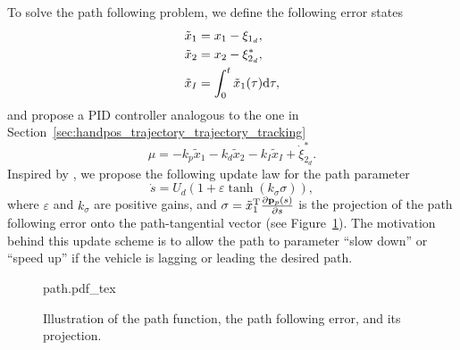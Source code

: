 To solve the path following problem, we define the following error states
\begin{subequations}
    \begin{align}
        \tilde{x}_1 &= x_1 - \xi_{1_d}, \\
        \tilde{x}_2 &= x_2 - \xi_{2_d}^{*}, \\
        \tilde{x}_I &= \int_{0}^t \tilde{x}_1(\tau) {\rm d}\tau,
    \end{align}
\end{subequations}
and propose a PID controller analogous to the one in Section~\ref{sec:handpos_trajectory_trajectory_tracking}
\begin{equation}
    \mu = -k_p\tilde{x}_1 - k_d\tilde{x}_2 - k_I\tilde{x}_I + \dot{\xi}_{2_d}^{*}.
\end{equation}
Inspired by \cite{belleter_2019_observer}, we propose the following update law for the path parameter 
\begin{equation}
    \dot{s} = U_d\left(1 + \varepsilon\tanh\left(k_{\sigma}\sigma\right)\right), \label{eq:handpos_trajectory_s_dot}
\end{equation}
where $\varepsilon$ and $k_{\sigma}$ are positive gains, and $\sigma = \tilde{x}_1^{\mathrm{T}} \frac{\partial \mathbf{p}_p(s)}{\partial s}$ is the projection of the path following error onto the path-tangential vector (see Figure~\ref{fig:path}).
The motivation behind this update scheme is to allow the path to parameter ``slow down'' or ``speed up'' if the vehicle is lagging or leading the desired path.

\begin{figure}[tb]
    \centering
    \def\svgwidth{0.6 \textwidth}
    {path.pdf_tex}
    \vspace*{-2mm}
    \caption{Illustration of the path function, the path following error, and its projection.}
    \label{fig:path}
\end{figure}

